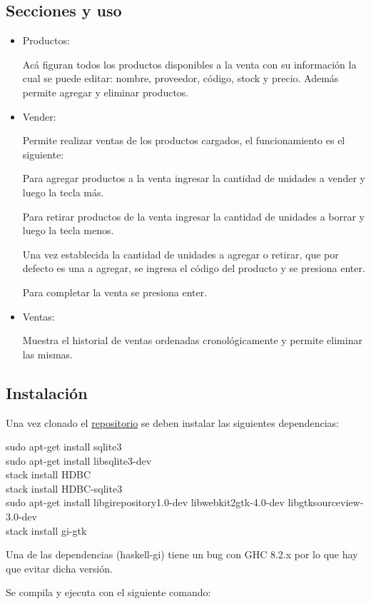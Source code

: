 \documentclass[a4paper,10pt]{article}
\begin{document}
\subsection{Secciones y uso}
\begin{itemize}
	\item Productos:

Acá figuran todos los productos disponibles a la venta con su información la cual se puede editar: nombre, proveedor, código, stock y precio. Además permite agregar y eliminar productos.
	\item Vender:

Permite realizar ventas de los productos cargados, el funcionamiento es el siguiente:

Para agregar productos a la venta ingresar la cantidad de unidades a vender y luego la tecla más.

Para retirar productos de la venta ingresar la cantidad de unidades a borrar y luego la tecla menos.

Una vez establecida la cantidad de unidades a agregar o retirar, que por defecto es una a agregar, se ingresa el código del producto y se presiona enter.

Para completar la venta se presiona enter.
	\item Ventas:

Muestra el historial de ventas ordenadas cronológicamente y permite eliminar las mismas.
\end{itemize}

\subsection{Instalación}
Una vez clonado el \href{https://github.com/murdoxix/Administrador-Granja}{repositorio} se deben instalar las siguientes dependencias:

\noindent
sudo apt-get install sqlite3\\
sudo apt-get install libsqlite3-dev\\
stack install HDBC\\
stack install HDBC-sqlite3\\
sudo apt-get install libgirepository1.0-dev libwebkit2gtk-4.0-dev libgtksourceview-3.0-dev\\
stack install gi-gtk


\danger Una de las dependencias (haskell-gi) tiene un bug con GHC 8.2.x por lo que hay que evitar dicha versión.

Se compila y ejecuta con el siguiente comando:
\end{document}

